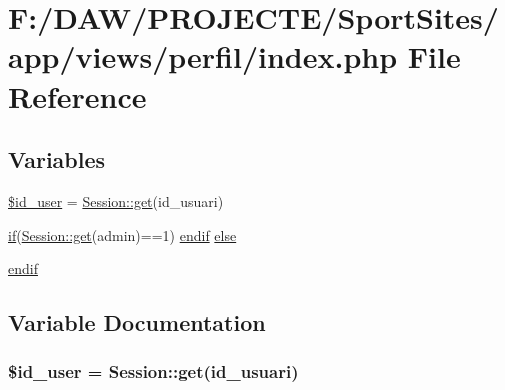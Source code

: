 \hypertarget{app_2views_2perfil_2index_8php}{}\section{F\+:/\+D\+A\+W/\+P\+R\+O\+J\+E\+C\+T\+E/\+Sport\+Sites/app/views/perfil/index.php File Reference}
\label{app_2views_2perfil_2index_8php}
\subsection*{Variables}
\begin{DoxyCompactItemize}
\item 
\hyperlink{app_2views_2perfil_2index_8php_a076f4e9335db95bc9db9c2695d128809}{\$id\+\_\+user} = \hyperlink{class_session_acf4e501ef0dfb6e98762fbecc9d75b9a}{Session\+::get}(\textquotesingle{}id\+\_\+usuari\textquotesingle{})
\item 
\hyperlink{app_2views_2index_2index_8php_af71ebd4d252438a1590e85e150ce8954}{if}(\hyperlink{class_session_acf4e501ef0dfb6e98762fbecc9d75b9a}{Session\+::get}(\textquotesingle{}admin\textquotesingle{})==1) \hyperlink{header_8php_a2f576def868d9b1e442c2042a246de2a}{endif} \hyperlink{app_2views_2perfil_2index_8php_a77f23c63bce02f4570dca646775fbe68}{else}
\item 
\hyperlink{app_2views_2perfil_2index_8php_a82cd33ca97ff99f2fcc5e9c81d65251b}{endif}
\end{DoxyCompactItemize}


\subsection{Variable Documentation}
\hypertarget{app_2views_2perfil_2index_8php_a076f4e9335db95bc9db9c2695d128809}{}
\subsubsection[{\$id\+\_\+user}]{\setlength{\rightskip}{0pt plus 5cm}\$id\+\_\+user = {\bf Session\+::get}(\textquotesingle{}id\+\_\+usuari\textquotesingle{})}\label{app_2views_2perfil_2index_8php_a076f4e9335db95bc9db9c2695d128809}
\hypertarget{app_2views_2perfil_2index_8php_a77f23c63bce02f4570dca646775fbe68}{}
